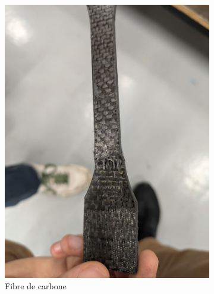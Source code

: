 \begin{figure}[!htb]
\begin{subfigure}[t]{.33\textwidth}
        \includegraphics[width=\textwidth]{../ressources/images/carbone_rupture}
        \caption{Fibre de carbone}
        \label{rupture_carbone}
    \end{subfigure}
    \begin{subfigure}[t]{.33\textwidth}

\end{subfigure}
\end{figure}
